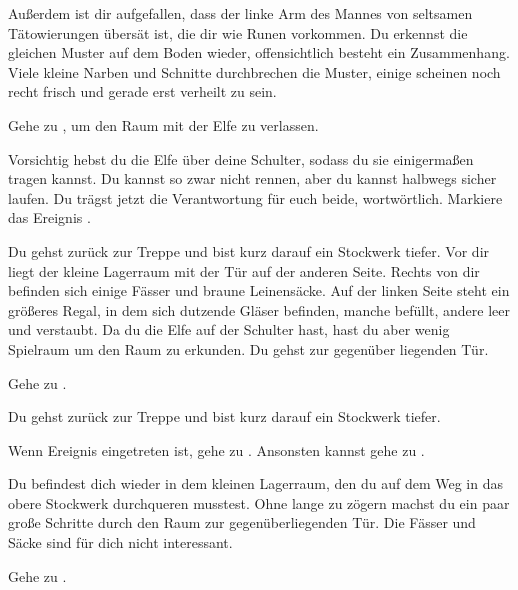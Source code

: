 Außerdem ist dir aufgefallen, dass der linke Arm des Mannes von seltsamen Tätowierungen übersät ist, die dir wie Runen vorkommen. Du erkennst die gleichen Muster auf dem Boden wieder, offensichtlich besteht ein Zusammenhang. Viele kleine Narben und Schnitte durchbrechen die Muster, einige scheinen noch recht frisch und gerade erst verheilt zu sein.

Gehe zu , um den Raum mit der Elfe zu verlassen.


Vorsichtig hebst du die Elfe über deine Schulter, sodass du sie einigermaßen tragen kannst. Du kannst so zwar nicht rennen, aber du kannst halbwegs sicher laufen. Du trägst jetzt die Verantwortung für euch beide, wortwörtlich. Markiere das Ereignis .

Du gehst zurück zur Treppe und bist kurz darauf ein Stockwerk tiefer. Vor dir liegt der kleine Lagerraum mit der Tür auf der anderen Seite. Rechts von dir befinden sich einige Fässer und braune Leinensäcke. Auf der linken Seite steht ein größeres Regal, in dem sich dutzende Gläser befinden, manche befüllt, andere leer und verstaubt. Da du die Elfe auf der Schulter hast, hast du aber wenig Spielraum um den Raum zu erkunden. Du gehst zur gegenüber liegenden Tür.

Gehe zu .


Du gehst zurück zur Treppe und bist kurz darauf ein Stockwerk tiefer.

Wenn Ereignis  eingetreten ist, gehe zu .
Ansonsten kannst gehe zu .


Du befindest dich wieder in dem kleinen Lagerraum, den du auf dem Weg in das obere Stockwerk durchqueren musstest. Ohne lange zu zögern machst du ein paar große Schritte durch den Raum zur gegenüberliegenden Tür. Die Fässer und Säcke sind für dich nicht interessant.

Gehe zu .


